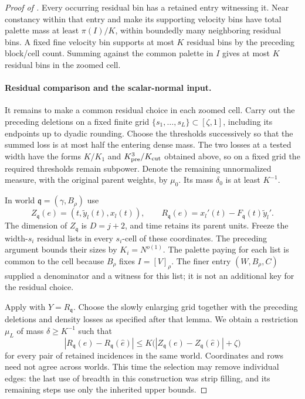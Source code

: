 \begin{proof}[Proof of ]
Every occurring residual bin has a retained entry witnessing it.
Near constancy within that entry and 
make its supporting velocity bins have total palette mass at
least \(\pi(I)/K\), within boundedly many neighboring residual
bins. A fixed fine velocity bin supports at most \(K\) residual
bins by the preceding block/cell count. Summing against the
common palette in \(I\) gives at most \(K\) residual bins in
the zoomed cell.

\paragraph{Residual comparison and the scalar-normal input.}
It remains to make a common residual choice in each zoomed cell.
Carry out the preceding deletions on a fixed finite grid
\(\{s_1,\ldots,s_L\}\subset[\zeta,1]\), including its endpoints
up to dyadic rounding. Choose the thresholds successively so that
the summed loss is at most half the entering dense mass. The two
losses at a tested width have the forms \(K/K_1\) and
\(K_{\rm pre}^3/K_{\rm cut}\) obtained above, so on a fixed grid
the required thresholds remain subpower. Denote the remaining
unnormalized measure, with the original parent weights, by \(\mu_0\).
Its mass \(\delta_0\) is at least \(K^{-1}\).

In world \(\mathfrak q=(\gamma,B_\rho)\) use
\[
 Z_{\mathfrak q}(e)=(t,\widetilde y_l(t),x_l(t)),\qquad
 R_{\mathfrak q}(e)=x_l'(t)
                  -F_{\mathfrak q}(t)\widetilde y_l'.
\]
The dimension of \(Z_{\mathfrak q}\) is \(D=j+2\), and time retains
its parent units. Freeze the width-\(s_i\) residual lists in every
\(s_i\)-cell of these coordinates. The preceding argument bounds
their sizes by \(K_i=N^{o(1)}\). The palette paying for each list is
common to the cell because \(B_\rho\) fixes \(I=[V]_\rho\).
The finer entry \((W,B_\rho,C)\) supplied a denominator and a witness
for this list; it is not an additional key for the residual choice.

Apply  with \(Y=R_{\mathfrak q}\).
Choose the slowly enlarging grid together with the preceding
deletions and density losses as specified after that lemma. We obtain
a restriction \(\mu_L\) of mass \(\delta\geq K^{-1}\) such that
\begin{equation}\label{a05:zoom-residual-comparison}
 |R_{\mathfrak q}(e)-R_{\mathfrak q}(\widehat e)|
 \leq K\bigl(|Z_{\mathfrak q}(e)-Z_{\mathfrak q}(\widehat e)|
                         +\zeta\bigr)
\end{equation}
for every pair of retained incidences in the same world.
Coordinates and rows need not agree across worlds. This time the
selection may remove individual edges: the last use of breadth in
this construction was strip filling, and its remaining steps use only the
inherited upper bounds.


\end{proof}
